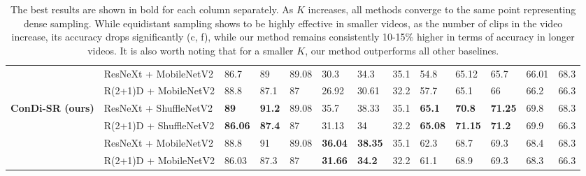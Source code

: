 \documentclass[a4paper,conference]{IEEEtran}
\begin{document}
\begin{table*}[h]
\begin{center}
{\begin{tabular}{lllllllllllll}
 & \cellcolor[HTML]{EFEFEF}ResNeXt + MobileNetV2 & 86.7 & 89 & 89.08 & \cellcolor[HTML]{EFEFEF}30.3 & \cellcolor[HTML]{EFEFEF}34.3 & \cellcolor[HTML]{EFEFEF}35.1 & 54.8 & 65.12 & 65.7 & 66.01 & 68.3 \\
 & \cellcolor[HTML]{EFEFEF}R(2+1)D + MobileNetV2 & 88.8 & 87.1 & 87 & \cellcolor[HTML]{EFEFEF}26.92 & \cellcolor[HTML]{EFEFEF}30.61 & \cellcolor[HTML]{EFEFEF}32.2 & 57.7 & 65.1 & 66 & 66.2 & 66.3 \\ \hline
\textbf{ConDi-SR (ours)} & \cellcolor[HTML]{EFEFEF}ResNeXt + ShuffleNetV2 & \textbf{89} & \textbf{91.2} & 89.08 & \cellcolor[HTML]{EFEFEF}35.7 & \cellcolor[HTML]{EFEFEF}38.33 & \cellcolor[HTML]{EFEFEF}35.1 & \textbf{65.1} & \textbf{70.8} & \textbf{71.25} & 69.8 & 68.3 \\
 & \cellcolor[HTML]{EFEFEF}R(2+1)D + ShuffleNetV2 & \textbf{86.06} & \textbf{87.4} & 87 & \cellcolor[HTML]{EFEFEF}31.13 & \cellcolor[HTML]{EFEFEF}34 & \cellcolor[HTML]{EFEFEF}32.2 & \textbf{65.08} & \textbf{71.15} & \textbf{71.2} & 69.9 & 66.3 \\
 & \cellcolor[HTML]{EFEFEF}ResNeXt + MobileNetV2 & 88.8 & 91 & 89.08 & \cellcolor[HTML]{EFEFEF}\textbf{36.04} & \cellcolor[HTML]{EFEFEF}\textbf{38.35} & \cellcolor[HTML]{EFEFEF}35.1 & 62.3 & 68.7 & 69.3 & 68.4 & 68.3 \\
 & \cellcolor[HTML]{EFEFEF}R(2+1)D + MobileNetV2 & 86.03 & 87.3 & 87 & \cellcolor[HTML]{EFEFEF}\textbf{31.66} & \cellcolor[HTML]{EFEFEF}\textbf{34.2} & \cellcolor[HTML]{EFEFEF}32.2 & 61.1 & 68.9 & 69.3 & 68.3 & 66.3 \\
\bottomrule
\end{tabular}}
\caption{The best results are shown in bold for each column separately. As $K$ increases, all methods converge to the same point representing dense sampling. While equidistant sampling shows to be highly effective in smaller videos, as the number of clips in the video increase, its accuracy drops significantly (c, f), while our method remains consistently 10-15\% higher in terms of accuracy in longer videos. It is also worth noting that for a smaller $K$, our method outperforms all other baselines.}
\label{tab:classification_accuracy}
\end{center}
\vspace{-15pt}
\end{table*}

\cite{devries2018learning}
\cite{gal2016uncertainty}
\cite{gao2020listen}
\cite{korbar2019scsampler}
\end{document}
